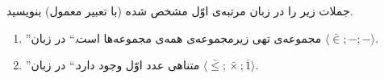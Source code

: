 جملات زیر را در زبان مرتبه‌ی اوّل مشخص شده (با تعبیر معمول) بنویسید.
  \begin{enumerate}[label=(\alph*)]
    \item ''مجموعه‌ی تهی زیرمجموعه‌ی همه‌ی مجموعه‌ها است.`` در زبان $\langle \bar{\in}; - ; -\rangle$.
    \item ''متناهی عدد اوّل وجود دارد.`` در زبان $\langle \bar{\leq} ; \bar{\times} ; \bar{1} \rangle$.
  \end{enumerate}